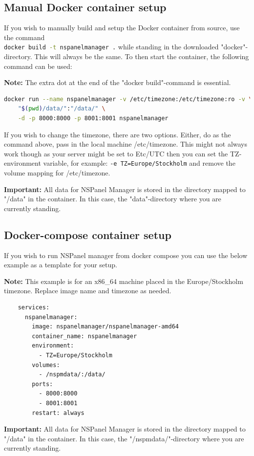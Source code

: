\documentclass[10pt]{article}
\newcommand{\note}[1]{\begin{noteBox} \textbf{Note:} #1 \end{noteBox}}
\newcommand{\important}[1]{\begin{importantBox} \textbf{Important:} #1 \end{importantBox}}
\begin{document}
    \subsection{Manual Docker container setup}
    If you wish to manually build and setup the Docker container from source, use the command \\ \lstinline[language=bash]{docker build -t nspanelmanager .} while standing in the downloaded "docker"-directory. This will always be the same. To then start the container, the following command can be used:
    \note{The extra dot at the end of the "docker build"-command is essential.}
    \begin{lstlisting}[language=bash]
    docker run --name nspanelmanager -v /etc/timezone:/etc/timezone:ro -v \
    "$(pwd)/data/":"/data/" \
    -d -p 8000:8000 -p 8001:8001 nspanelmanager
    \end{lstlisting}
    If you wish to change the timezone, there are two options. Either, do as the command above, pass in the local machine /etc/timezone. This might not always work though as your server might be set to Etc/UTC then you can set the TZ-environment variable, for example: \lstinline[language=bash]{-e TZ=Europe/Stockholm} and remove the volume mapping for /etc/timezone.
    \important{All data for NSPanel Manager is stored in the directory mapped to "/data" in the container. In this case, the "data"-directory where you are currently standing.}


    \subsection{Docker-compose container setup}
    If you wish to run NSPanel manager from docker compose you can use the below example as a template for your setup.
    \note{This example is for an x86\_64 machine placed in the Europe/Stockholm timezone. Replace image name and timezone as needed.}
    \begin{lstlisting}
    services:
      nspanelmanager:
        image: nspanelmanager/nspanelmanager-amd64
        container_name: nspanelmanager
        environment:
          - TZ=Europe/Stockholm
        volumes:
          - /nspmdata/:/data/
        ports:
          - 8000:8000
          - 8001:8001
        restart: always
    \end{lstlisting}
    \important{All data for NSPanel Manager is stored in the directory mapped to "/data" in the container. In this case, the "/nspmdata/"-directory where you are currently standing.}
\end{document}
